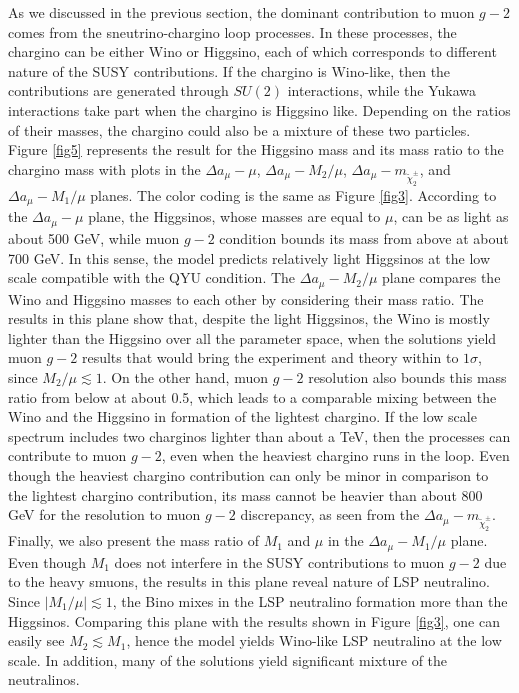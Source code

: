 \documentclass[12pt]{article}
\begin{document}
As we discussed in the previous section, the dominant contribution to muon $g-2$ comes from the sneutrino-chargino loop processes. In these processes, the chargino can be either Wino or Higgsino, each of which corresponds to different nature of the SUSY contributions. If the chargino is Wino-like, then the contributions are generated through $SU(2)$ interactions, while the Yukawa interactions take part when the chargino is Higgsino like. Depending on the ratios of their masses, the chargino could also be a mixture of these two particles. Figure \ref{fig5} represents the result for the Higgsino mass and its mass ratio to the chargino mass with plots in the $\Delta a_{\mu}-\mu$, $\Delta a_{\mu}-M_{2}/\mu$, $\Delta a_{\mu}-m_{\tilde{\chi}_{2}^{\pm}}$, and $\Delta a_{\mu}-M_{1}/\mu$ planes. The color coding is the same as Figure \ref{fig3}. According to the $\Delta a_{\mu}-\mu$ plane, the Higgsinos, whose masses are equal to $\mu$, can be as light as about 500 GeV, while muon $g-2$ condition bounds its mass from above at about 700 GeV. In this sense, the model predicts relatively light Higgsinos at the low scale compatible with the QYU condition. The $\Delta a_{\mu}-M_{2}/\mu$ plane compares the Wino and Higgsino masses to each other by considering their mass ratio. The results in this plane show that, despite the light Higgsinos, the Wino is mostly lighter than the Higgsino over all the parameter space, when the solutions yield muon $g-2$ results that would bring the experiment and theory within to $1\sigma$, since $M_{2}/\mu \lesssim 1$. On the other hand, muon $g-2$ resolution also bounds this mass ratio from below at about 0.5, which leads to a comparable mixing between the Wino and the Higgsino in formation of the lightest chargino. If the low scale spectrum includes two charginos lighter than about a TeV, then the processes can contribute to muon $g-2$, even when the heaviest chargino runs in the loop. Even though the heaviest chargino contribution can only be minor in comparison to the lightest chargino contribution, its mass cannot be heavier than about 800 GeV for the resolution to muon $g-2$ discrepancy, as seen from the  $\Delta a_{\mu}-m_{\tilde{\chi}_{2}^{\pm}}$. Finally, we also present the mass ratio of $M_{1}$ and $\mu$ in the $\Delta a_{\mu}-M_{1}/\mu$ plane. Even though $M_{1}$ does not interfere  in the SUSY contributions to muon $g-2$ due to the heavy smuons, the results in this plane reveal nature of LSP neutralino. Since $|M_{1}/\mu| \lesssim 1$, the Bino mixes in the LSP neutralino formation more than the Higgsinos. Comparing this plane with the results shown in Figure \ref{fig3}, one can easily see $M_{2} \lesssim M_{1}$, hence the model yields Wino-like LSP neutralino at the low scale. In addition, many of the solutions yield significant mixture of the neutralinos.
\end{document}
